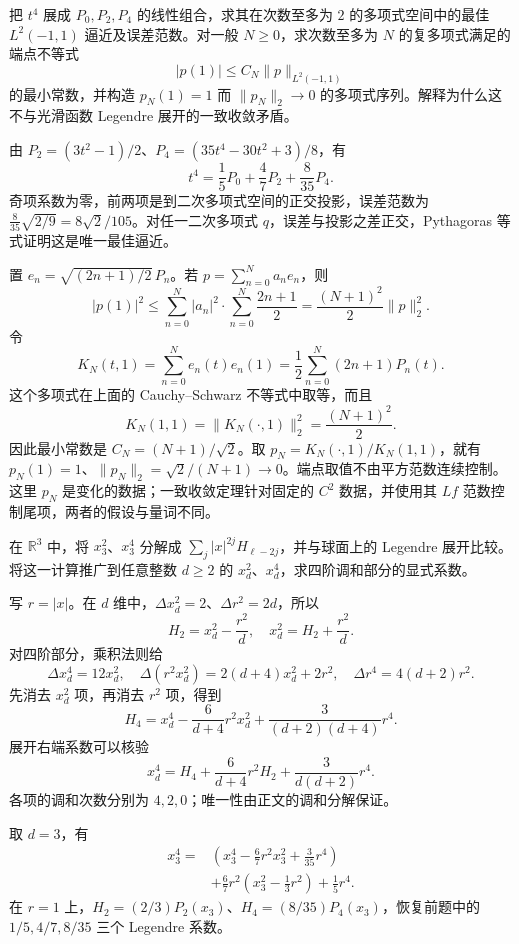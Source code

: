 \begin{exercise}\label{b2:ex:B2-legendre-projection}
把 \(t^4\) 展成 \(P_0,P_2,P_4\) 的线性组合，求其在次数至多为 \(2\) 的多项式空间中的最佳 \(L^2(-1,1)\) 逼近及误差范数。对一般 \(N\ge0\)，求次数至多为 \(N\) 的复多项式满足的端点不等式
\[
 |p(1)|\le C_N\|p\|_{L^2(-1,1)}
\]
的最小常数，并构造 \(p_N(1)=1\) 而 \(\|p_N\|_2\to0\) 的多项式序列。解释为什么这不与光滑函数 Legendre 展开的一致收敛矛盾。
\end{exercise}
\begin{solution}
由 \(P_2=(3t^2-1)/2\)、\(P_4=(35t^4-30t^2+3)/8\)，有
\[
 t^4=\frac15P_0+\frac47P_2+\frac8{35}P_4.
\]
奇项系数为零，前两项是到二次多项式空间的正交投影，误差范数为 \(\frac8{35}\sqrt{2/9}=8\sqrt2/105\)。对任一二次多项式 \(q\)，误差与投影之差正交，Pythagoras 等式证明这是唯一最佳逼近。

置 \(e_n=\sqrt{(2n+1)/2}\,P_n\)。若 \(p=\sum_{n=0}^Na_ne_n\)，则
\[
 |p(1)|^2\le\sum_{n=0}^N|a_n|^2
                 \cdot\sum_{n=0}^N\frac{2n+1}{2}
 =\frac{(N+1)^2}{2}\|p\|_2^2.
\]
令
\[
 K_N(t,1)=\sum_{n=0}^Ne_n(t)e_n(1)
          =\frac12\sum_{n=0}^N(2n+1)P_n(t).
\]
这个多项式在上面的 Cauchy--Schwarz 不等式中取等，而且
\[
 K_N(1,1)=\|K_N(\cdot,1)\|_2^2=\frac{(N+1)^2}{2}.
\]
因此最小常数是 \(C_N=(N+1)/\sqrt2\)。取
\(p_N=K_N(\cdot,1)/K_N(1,1)\)，就有 \(p_N(1)=1\)、\(\|p_N\|_2=\sqrt2/(N+1)\to0\)。端点取值不由平方范数连续控制。这里 \(p_N\) 是变化的数据；一致收敛定理针对固定的 \(C^2\) 数据，并使用其 \(Lf\) 范数控制尾项，两者的假设与量词不同。
\end{solution}

\begin{exercise}\label{b2:ex:B2-harmonic-parts}
在 \(\mathbb R^3\) 中，将 \(x_3^2\)、\(x_3^4\) 分解成 \(\sum_j|x|^{2j}H_{\ell-2j}\)，并与球面上的 Legendre 展开比较。将这一计算推广到任意整数 \(d\ge2\) 的 \(x_d^2\)、\(x_d^4\)，求四阶调和部分的显式系数。
\end{exercise}
\begin{solution}
写 \(r=|x|\)。在 \(d\) 维中，\(\Delta x_d^2=2\)、\(\Delta r^2=2d\)，所以
\[
 H_2=x_d^2-\frac{r^2}{d},\quad x_d^2=H_2+\frac{r^2}{d}.
\]
对四阶部分，乘积法则给
\[
 \Delta x_d^4=12x_d^2,\quad
 \Delta(r^2x_d^2)=2(d+4)x_d^2+2r^2,
 \quad \Delta r^4=4(d+2)r^2.
\]
先消去 \(x_d^2\) 项，再消去 \(r^2\) 项，得到
\[
 H_4=x_d^4-\frac6{d+4}r^2x_d^2
                +\frac3{(d+2)(d+4)}r^4.
\]
展开右端系数可以核验
\[
 x_d^4=H_4+\frac6{d+4}r^2H_2
                  +\frac3{d(d+2)}r^4.
\]
各项的调和次数分别为 \(4,2,0\)；唯一性由正文的调和分解保证。

取 \(d=3\)，有
\[
 \begin{aligned}
 x_3^4={}&\left(x_3^4-\frac67r^2x_3^2+\frac3{35}r^4\right)\\
 &+\frac67r^2\left(x_3^2-\frac13r^2\right)+\frac15r^4.
 \end{aligned}
\]
在 \(r=1\) 上，\(H_2=(2/3)P_2(x_3)\)、\(H_4=(8/35)P_4(x_3)\)，恢复前题中的 \(1/5,4/7,8/35\) 三个 Legendre 系数。

\end{solution}

